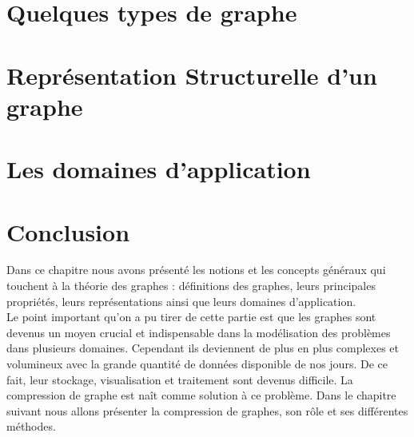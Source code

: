 	\section{Quelques types de graphe}
			
	
	
    		
    	\section{Représentation Structurelle d'un graphe}	
		
	
	\section{Les domaines d'application}
			
		
	
	
			
	\section{Conclusion}
Dans ce chapitre nous avons présenté les notions et les concepts généraux qui touchent à la théorie des graphes : définitions des graphes, leurs principales propriétés, leurs représentations ainsi que leurs domaines d'application.\\
Le point important qu'on a pu tirer de cette partie est que les graphes sont devenus un moyen crucial et indispensable dans la modélisation des problèmes dans plusieurs domaines. Cependant ils deviennent de plus en plus complexes et volumineux avec la grande quantité de données disponible de nos jours. De ce fait, leur stockage, visualisation et traitement sont devenus difficile. La compression de graphe est naît comme solution à ce problème. Dans le chapitre suivant nous allons présenter la compression de graphes, son rôle et ses différentes méthodes.  
	
	